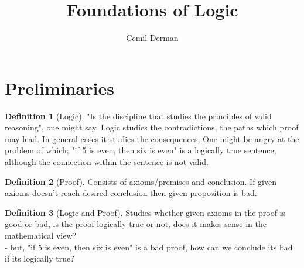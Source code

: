 \documentclass[12pt]{article}
\title{Foundations of Logic}
\author{Cemil Derman}
\date{}
\theoremstyle{definition}
\newtheorem{definition}{Definition}[section]
\begin{document}
\maketitle

\section{Preliminaries}

\begin{definition}[Logic]
"Is the discipline that studies the principles of valid reasoning", one might say.
  Logic studies the contradictions, the paths which proof may lead. In general cases it studies the consequences,
  One might be angry at the problem of which;
  "if 5 is even, then six is even" is a logically true sentence, although the connection within the sentence is not valid.

\end{definition}

\begin{definition}[Proof]
       Consists of axioms/premises and conclusion.
    If given axioms doesn't reach desired conclusion then given proposition is bad. 

\end{definition}
\begin{definition}[Logic and Proof]
  Studies whether given axioms in the proof is good or bad,
  is the proof logically true or not, does it makes sense in the mathematical view?
\\ - but,   "if 5 is even, then six is even" is a bad proof, how can we conclude
    its bad if its logically true? %
\end{definition}
\end{document}
